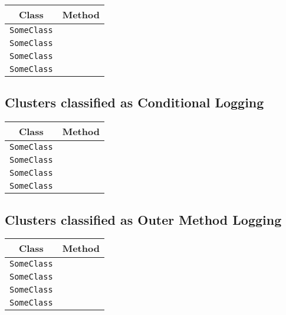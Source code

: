 \begin{center}
\begin{tabular}{ll}\toprule
\multicolumn{1}{c}{Class}&\multicolumn{1}{c}{Method}\\\midrule
\lstinline/SomeClass/&\raisebox{0pt}{\lstinline/foo(int)/}\\
\lstinline/SomeClass/&\raisebox{0pt}{\lstinline/foo(int)/}\\
\lstinline/SomeClass/&\raisebox{0pt}{\lstinline/foo(int)/}\\
\lstinline/SomeClass/&\raisebox{0pt}{\lstinline/foo(int)/}\\
\bottomrule
\end{tabular}
\end{center}

\subsection{Clusters classified as Conditional Logging}

\begin{center}
\begin{tabular}{ll}\toprule
\multicolumn{1}{c}{Class}&\multicolumn{1}{c}{Method}\\\midrule
\lstinline/SomeClass/&\raisebox{0pt}{\lstinline/foo(int)/}\\
\lstinline/SomeClass/&\raisebox{0pt}{\lstinline/foo(int)/}\\
\lstinline/SomeClass/&\raisebox{0pt}{\lstinline/foo(int)/}\\
\lstinline/SomeClass/&\raisebox{0pt}{\lstinline/foo(int)/}\\
\bottomrule
\end{tabular}
\end{center}

\subsection{Clusters classified as Outer Method Logging}

\begin{center}
\begin{tabular}{ll}\toprule
\multicolumn{1}{c}{Class}&\multicolumn{1}{c}{Method}\\\midrule
\lstinline/SomeClass/&\raisebox{0pt}{\lstinline/foo(int)/}\\
\lstinline/SomeClass/&\raisebox{0pt}{\lstinline/foo(int)/}\\
\lstinline/SomeClass/&\raisebox{0pt}{\lstinline/foo(int)/}\\
\lstinline/SomeClass/&\raisebox{0pt}{\lstinline/foo(int)/}\\
\bottomrule
\end{tabular}
\end{center}

